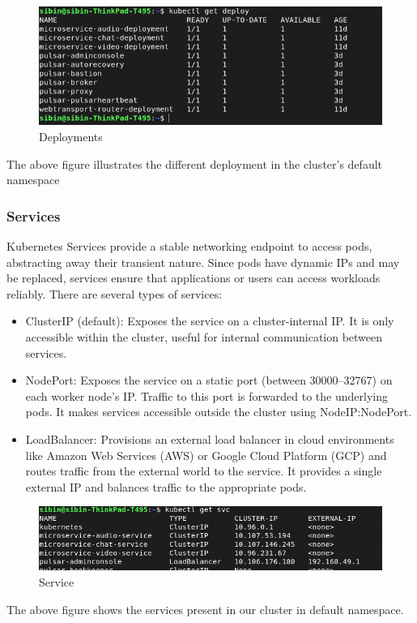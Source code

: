 \begin{figure}[H]
\caption{Deployments}
\centering
\includegraphics[width=1\textwidth]{SOA/k_deploy.png}
\end{figure}
The above figure illustrates the different deployment in the cluster's default namespace

\subsubsection{Services}
Kubernetes Services provide a stable networking endpoint to access pods, abstracting away their transient nature. Since pods have dynamic IPs and may be replaced, services ensure that applications or users can access workloads reliably. There are several types of services:

\begin{itemize}
    \item ClusterIP (default): Exposes the service on a cluster-internal IP. It is only accessible within the cluster, useful for internal communication between services.
    \item NodePort: Exposes the service on a static port (between 30000–32767) on each worker node's IP. Traffic to this port is forwarded to the underlying pods. It makes services accessible outside the cluster using  NodeIP:NodePort.
    \item LoadBalancer: Provisions an external load balancer in cloud environments like Amazon Web Services (AWS) or Google Cloud Platform (GCP) and routes traffic from the external world to the service. It provides a single external IP and balances traffic to the appropriate pods.
\end{itemize}

\begin{figure}[H]
\caption{Service}
\centering
\includegraphics[width=1\textwidth]{SOA/k_svc.png}
\end{figure}
The above figure shows the services present in our cluster in default namespace.


